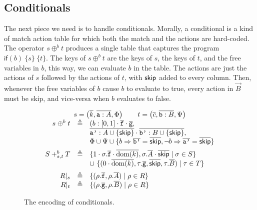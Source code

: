 \subsection{Conditionals}

The next piece we need is to handle conditionals. Morally, a
conditional is a kind of match action table for which both the match
and the actions are hard-coded.  The operator $s \oplus^b t$ produces
a single table that captures the program
$\mathsf{if}(b)~\{s\}~\{t\}$. The keys of $s \oplus^b t$ are the keys
of $s$, the keys of $t$, and the free variables in $b$, this way, we
can evaluate $b$ in the table.  The actions are just the actions of
$s$ followed by the actions of $t$, with $\mathsf{skip}$ added to every
column. Then, whenever the free variables of $b$ cause $b$ to evaluate
to true, every action in $\vec B$ must be skip, and vice-versa when
$b$ evaluates to false.



\begin{figure}[tpb]
  \[\begin{array}{rcl}
      \multicolumn 3 c {s = \left(\vec{k}, \vec{\var a : A}, \Phi\right) \qquad t = \left(\vec{c}, \vec{\var b : B}, \Psi\right)}\\
      s \mathrel{\oplus^b} t
      & \triangleq
      & (b : [0,1] \cdot\vec{\var f}\cdot \vec{\var g},\\
      && \vec{\var{a'} : A \cup \{\SKIP\}}\cdot\vec{\var{b'} : B \cup \{\SKIP\}},\\
      && \Phi \cup \Psi \cup \{b \Rightarrow \vec{\var{b'}} = \overrightarrow \SKIP, \neg b \Rightarrow \vec {\var{a'}} = \overrightarrow\SKIP\}\\[.5em]
      S +^b_{s,t} T
      & \triangleq
      & \{1 \cdot \sigma.\vec{\var{f}} \cdot \overline{\dom(k)}, \sigma.\vec A \cdot \overline{\SKIP} \mid \sigma \in S \} \\
      && \cup~\{(0 \cdot \overline{\dom(k)}, \tau.\vec{\var{g}}, \overline{\SKIP}, \tau.\vec B) \mid  \tau \in T \}\\[.5em]
      R|_s
      &\triangleq
      & \{(\rho.\vec{\var f},\rho.{\vec A}) \mid  \rho \in R\}\\
      R|_t
      & \triangleq
      & \{(\rho.\vec{\var g}, \rho.\vec B) \mid \rho \in R\}
    \end{array}
  \]
  \caption{The encoding of conditionals. }
  \label{fig:conditionals}
\end{figure}

